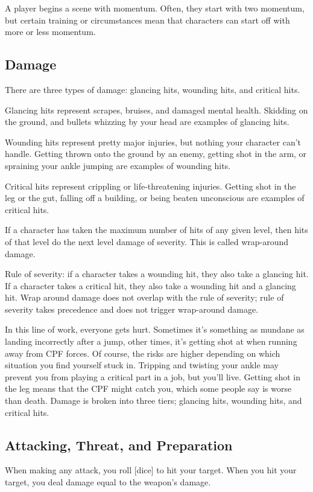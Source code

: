 \documentclass{article}
\begin{document}
A player begins a scene with momentum. Often, they start with two momentum, but certain training or circumstances mean that characters can start off with more or less momentum.
\subsection{Damage}
There are three types of damage: glancing hits, wounding hits, and critical hits.

Glancing hits represent scrapes, bruises, and damaged mental health. Skidding on the ground, and bullets whizzing by your head are examples of glancing hits.

Wounding hits represent pretty major injuries, but nothing your character can’t handle. Getting thrown onto the ground by an enemy, getting shot in the arm, or spraining your ankle jumping are examples of wounding hits.

Critical hits represent crippling or life-threatening injuries. Getting shot in the leg or the gut, falling off a building, or being beaten unconscious are examples of critical hits.

If a character has taken the maximum number of hits of any given level, then hits of that level do the next level damage of severity. This is called wrap-around damage.

Rule of severity: if a character takes a wounding hit, they also take a glancing hit. If a character takes a critical hit, they also take a wounding hit and a glancing hit. Wrap around damage does not overlap with the rule of severity; rule of severity takes precedence and does not trigger wrap-around damage.

In this line of work, everyone gets hurt. Sometimes it’s something as mundane as landing incorrectly after a jump, other times, it’s getting shot at when running away from CPF forces. Of course, the risks are higher depending on which situation you find yourself stuck in. Tripping and twisting your ankle may prevent you from playing a critical part in a job, but you’ll live. Getting shot in the leg means that the CPF might catch you, which some people say is worse than death. Damage is broken into three tiers; glancing hits, wounding hits, and critical hits.
\subsection{Attacking, Threat, and Preparation}
When making any attack, you roll [dice] to hit your target. When you hit your target, you deal damage equal to the weapon’s damage.
\end{document}

